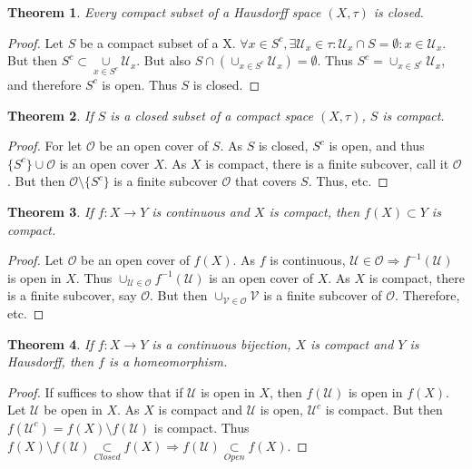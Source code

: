 \documentclass[oneside]{book}
\theoremstyle{mystyle}
\newtheorem{theorem}{Theorem}[section]
\begin{document}
\begin{theorem}
Every compact subset of a Hausdorff space $(X,\tau)$ is closed.
\end{theorem}
\begin{proof}
Let $S$ be a compact subset of a X. $\forall x\in S^c, \exists \mathcal{U}_x\in \tau:\mathcal{U}_x\cap S = \emptyset:x\in \mathcal{U}_x$. But then $S^c \subset \underset{x\in S^c}\cup\mathcal{U}_x$. But also $S\cap (\cup_{x\in S^c}\mathcal{U}_x) = \emptyset$. Thus $S^c = \cup_{x\in S^c}\mathcal{U}_x$, and therefore $S^c$ is open. Thus $S$ is closed.
\end{proof}

\begin{theorem}
If $S$ is a closed subset of a compact space $(X,\tau)$, $S$ is compact.
\end{theorem}
\begin{proof}
For let $\mathcal{O}$ be an open cover of $S$. As $S$ is closed, $S^c$ is open, and thus $\{S^c\} \cup \mathcal{O}$ is an open cover $X$. As $X$ is compact, there is a finite subcover, call it $\mathscr{O}$. But then $\mathscr{O}\setminus \{S^c\}$ is a finite subcover $\mathcal{O}$ that covers $S$. Thus, etc.
\end{proof}

\begin{theorem}
If $f:X\rightarrow Y$ is continuous and $X$ is compact, then $f(X)\subset Y$ is compact.
\end{theorem}
\begin{proof}
Let $\mathcal{O}$ be an open cover of $f(X)$. As $f$ is continuous, $\mathcal{U}\in\mathcal{O}\Rightarrow f^{-1}(\mathcal{U})$ is open in $X$. Thus $\cup_{\mathcal{U}\in \mathcal{O}} f^{-1}(\mathcal{U})$ is an open cover of $X$. As $X$ is compact, there is a finite subcover, say $\mathscr{O}$. But then $\cup_{\mathcal{V}\in \mathscr{O}} \mathcal{V}$ is a finite subcover of $\mathcal{O}$. Therefore, etc.
\end{proof}

\begin{theorem}
If $f:X\rightarrow Y$ is a continuous bijection, $X$ is compact and $Y$ is Hausdorff, then $f$ is a homeomorphism.
\end{theorem}
\begin{proof}
If suffices to show that if $\mathcal{U}$ is open in $X$, then $f(\mathcal{U})$ is open in $f(X)$. Let $\mathcal{U}$ be open in $X$. As $X$ is compact and $\mathcal{U}$ is open, $\mathcal{U}^c$ is compact. But then $f(\mathcal{U}^c) = f(X)\setminus f(\mathcal{U})$ is compact. Thus $f(X)\setminus f(\mathcal{U})\underset{Closed}\subset f(X)\Rightarrow f(\mathcal{U})\underset{Open}\subset f(X)$.
\end{proof}
\end{document}
